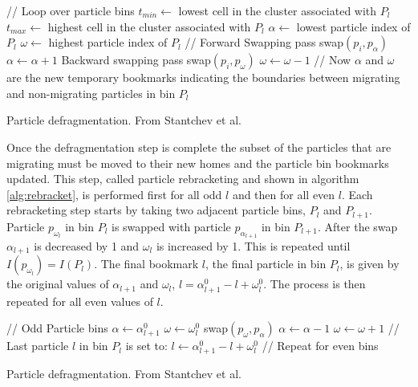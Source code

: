 \begin{algorithm}
	\begin{algorithmic}
		\STATE // Loop over particle bins
			\STATE $t_{min} \leftarrow$ lowest cell in the cluster associated with $P_l$
			\STATE $t_{max} \leftarrow$ highest cell in the cluster associated with $P_l$
			\STATE $\alpha \leftarrow$ lowest particle index of  $P_l$
			\STATE $\omega \leftarrow$ highest particle index of $P_l$
			\STATE // Forward Swapping pass 
					\STATE swap$(p_i, p_{\alpha})$
					\STATE $\alpha \leftarrow \alpha + 1$
				\ENDIF			
			\ENDFOR
			\STATE Backward swapping pass
					\STATE swap$(p_i, p_{\omega})$
					\STATE $\omega \leftarrow \omega - 1$
				\ENDIF			
			\ENDFOR
			\STATE // Now $\alpha$ and $\omega$ are the new temporary bookmarks indicating the boundaries between migrating and non-migrating particles in bin $P_l$
		\ENDFOR
	\end{algorithmic}
	\caption{Particle defragmentation. From Stantchev et al. \cite{Stantchev2008}}
	\label{alg:defrag}
\end{algorithm}


 Once the defragmentation step is complete the subset of the particles that are migrating must be moved to their new homes and the particle bin bookmarks updated. This step, called particle rebracketing and shown in algorithm \ref{alg:rebracket}, is performed first for all odd $l$ and then for all even $l$. Each rebracketing step starts by taking two adjacent particle bins, $P_l$ and $P_{l+1}$. Particle $p_{\omega_l}$ in bin $P_{l}$ is swapped with particle $p_{\alpha_{l+1}}$ in bin $P_{l+1}$. After the swap $\alpha_{l+1}$ is decreased by 1 and $\omega_l$ is increased by 1. This is repeated until $I(p_{\omega_l}) = I(P_l)$. The final bookmark $l$, the final particle in bin $P_l$, is given by the original values of $\alpha_{l+1}$ and $\omega_l$, $l = \alpha_{l+1}^0 - l + \omega_l^0$. The process is then repeated for all even values of $l$.

\begin{algorithm}
	\begin{algorithmic}
		\STATE // Odd Particle bins
		\FORALL{particle bin $P_l$ where $l$ is odd}
			\STATE $\alpha \leftarrow \alpha_{l+1}^0$
			\STATE $\omega \leftarrow \omega_l^0$
			\WHILE{$I(p_{\omega+1}) \ne I(P_l)$}
				\STATE swap$(p_\omega,p_\alpha)$
				\STATE $\alpha \leftarrow \alpha - 1$ 
				\STATE $\omega \leftarrow \omega + 1$ 		
			\ENDWHILE
			\STATE // Last particle $l$ in bin $P_l$ is set to:
			\STATE $l \leftarrow \alpha_{l+1}^0 - l + \omega_l^0$
		\ENDFOR
		\STATE // Repeat for even bins
	\end{algorithmic}
	\caption{Particle defragmentation. From Stantchev et al. \cite{Stantchev2008}}
	\label{alg:rebracket}
\end{algorithm}

